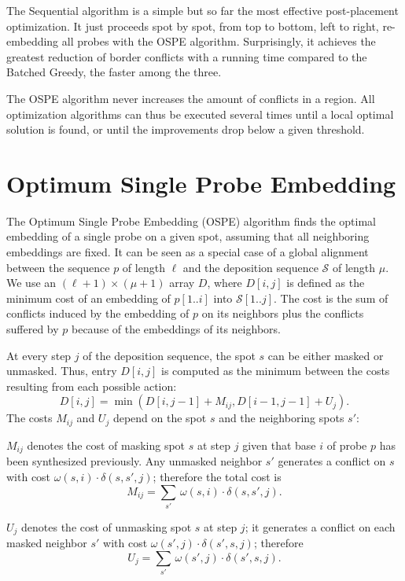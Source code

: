 \documentclass{llncs}
\begin{document}
The Sequential algorithm is a simple but so far the most effective
post-placement optimization. It just proceeds spot by spot, from top to
bottom, left to right, re-embedding all probes with the OSPE algorithm.
Surprisingly, it achieves the greatest reduction of border conflicts with a
running time compared to the Batched Greedy, the faster among the three.

The OSPE algorithm never increases the amount of conflicts in a region.  All
optimization algorithms can thus be executed several times until a local
optimal solution is found, or until the improvements drop below a given
threshold.


\section{Optimum Single Probe Embedding}
\label{sec:ospe}

The Optimum Single Probe Embedding (OSPE) algorithm finds the optimal
embedding of a single probe on a given spot, assuming that all neighboring
embeddings are fixed. It can be seen as a special case of a global alignment
between the sequence $p$ of length $\ell$ and the deposition sequence
$\mathcal{S}$ of length $\mu$. We use an $(\ell + 1) \times (\mu + 1)$ array
$D$, where $D[i,j]$ is defined as the minimum cost of an embedding of
$p[1..i]$ into $\mathcal{S}[1..j]$.  The cost is the sum of conflicts induced
by the embedding of $p$ on its neighbors plus the conflicts suffered by $p$
because of the embeddings of its neighbors.

At every step $j$ of the deposition sequence, the spot $s$ can be either
masked or unmasked. Thus, entry $D[i,j]$ is computed as the minimum between
the costs resulting from each possible action:
\[
D[i,j] = \min (D[i,j-1] + M_{ij}, D[i-1,j-1] + U_{j}).
\]
The costs $M_{ij}$ and $U_{j}$ depend on the spot $s$ and the neighboring
spots $s'$:

$M_{ij}$ denotes the cost of masking spot $s$ at step $j$ given that base $i$
of probe $p$ has been synthesized previously.  Any unmasked neighbor $s'$
generates a conflict on $s$ with cost $\omega(s,i)\cdot \delta(s,s',j)$;
therefore the total cost is
\[ M_{ij} = \sum_{s'}\, \omega(s,i) \cdot \delta(s,s',j). \]

$U_{j}$ denotes the cost of unmasking spot $s$ at step $j$; it generates a
conflict on each masked neighbor $s'$ with cost $\omega(s',j)\cdot
\delta(s',s,j)$; therefore 
\[ U_j = \sum_{s'}\, \omega(s',j) \cdot \delta(s',s,j). \]
\end{document}
